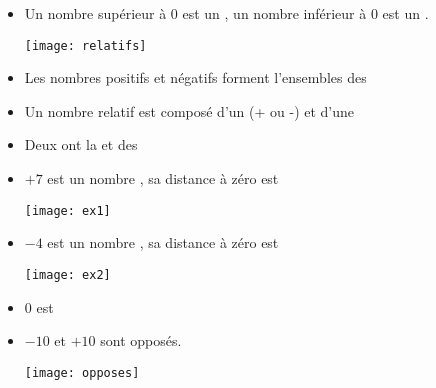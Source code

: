 \begin{mydefs}
	\begin{itemize}
		\item Un nombre supérieur à 0 est un \hspace*{5cm}, un nombre inférieur à 0 est un \hspace*{5cm}.
		
		\begin{center}
			\texttt{[image: relatifs]}
		\end{center}
		
		\item Les nombres positifs et négatifs forment l'ensembles des %
		
		\item Un nombre relatif est composé d'un \hspace{3cm} (+ ou -) et d'une %
		
		\item Deux \hspace*{5cm} ont la \hspace*{6cm} et des %
		
	\end{itemize}
\end{mydefs}


\begin{myexs}
	\begin{itemize}
		\item $+7$ est un nombre \hspace*{3cm}, sa distance à zéro est %
		\begin{center}
			\texttt{[image: ex1]}
		\end{center}
		\item $\num{-4}$ est un nombre \hspace*{3cm}, sa distance à zéro est %
		\begin{center}
			\texttt{[image: ex2]}
		\end{center}
		\item $0$ est %
		\item $-10$ et $+10$ sont opposés.
		\begin{center}
			\texttt{[image: opposes]}
		\end{center}
	\end{itemize}
\end{myexs}